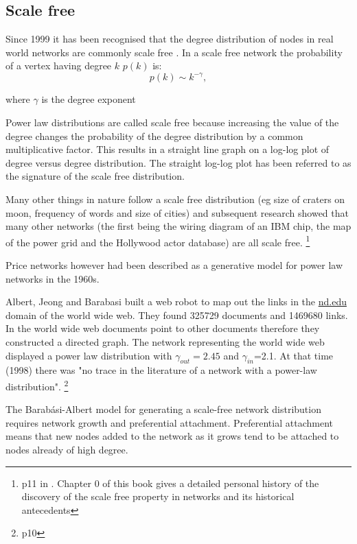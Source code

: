 \subsection{Scale free}
\label{sec:scale_free}
Since 1999 it has been recognised that the degree distribution of nodes in real world networks are commonly scale free \cite{barabasi1999emergence} \cite{barabasi1999mean}. In a scale free network the probability of a vertex having degree $k$ $p(k)$ is:
\begin{equation}
    p(k) \sim k^{-\gamma},
\end{equation}
\label{eq:scale free}

where $\gamma$ is the degree exponent \cite{barabasi2016network}

Power law distributions are called scale free because increasing the value of the degree changes the probability of the degree distribution by a common multiplicative factor. This results in a straight line graph on a log-log plot of degree versus degree distribution. The straight log-log plot has been referred to as the signature of the scale free distribution. 

Many other things in nature follow a scale free distribution (eg size of craters on moon, frequency of words and size of cities) and subsequent research showed that many other networks (the first being the wiring diagram of an IBM chip, the map of the power grid and the Hollywood actor database) are all scale free.\cite{barabasi2016network} \footnote{ p11 in \cite{barabasi2016network}. Chapter 0 of this book gives a detailed personal history of the discovery of the scale free property in networks and its historical antecedents}

Price networks however had been described as a generative model for power law networks in the 1960s. 

Albert, Jeong and Barabasi \cite{albert1999diameter} built a web robot to map out the links in the \url{nd.edu} domain of the world wide web. They found 325729 documents and 1469680 links. In  the world wide web documents point to other documents therefore they constructed a directed graph. The network representing the world wide web displayed a power law distribution with $\gamma_{out}=2.45$ and $\gamma_{in}$=2.1. At that time (1998) there was "no trace in the literature of a network with a power-law distribution". \cite{barabasi2016network}\footnote{p10}

The Barab\'asi-Albert model for generating a scale-free network distribution requires network growth and preferential attachment. Preferential attachment means that new nodes added to the network as it grows tend to be attached to nodes already of high degree.\cite{barabasi1999emergence}

